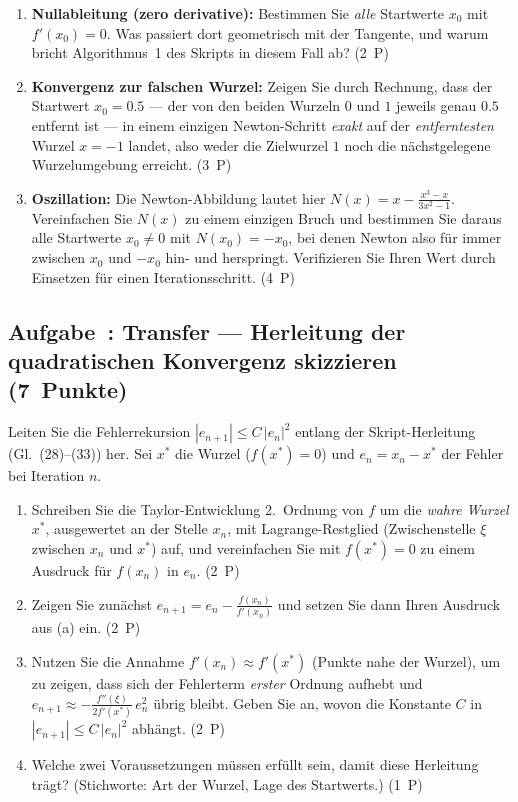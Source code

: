 \documentclass[a4paper,11pt]{scrartcl}
\newcounter{aufgabe}
\newcommand{\Aufgabe}[2]{%
  \refstepcounter{aufgabe}%
  \subsection*{Aufgabe~\theaufgabe: #1 \hfill (#2~Punkte)}%
  \label{auf:\theaufgabe}}
\begin{document}
\begin{enumerate}[label=(\alph*)]
  \item \textbf{Nullableitung (zero derivative):} Bestimmen Sie \emph{alle} Startwerte
  $x_0$ mit $f'(x_0) = 0$. Was passiert dort geometrisch mit der Tangente, und warum
  bricht Algorithmus~1 des Skripts in diesem Fall ab? \hfill (2~P)
  \item \textbf{Konvergenz zur falschen Wurzel:} Zeigen Sie durch Rechnung, dass der
  Startwert $x_0 = 0.5$ --- der von den beiden Wurzeln $0$ und $1$ jeweils genau $0.5$
  entfernt ist --- in einem einzigen Newton-Schritt \emph{exakt} auf der \emph{entferntesten}
  Wurzel $x = -1$ landet, also weder die Zielwurzel $1$ noch die nächstgelegene
  Wurzelumgebung erreicht. \hfill (3~P)
  \item \textbf{Oszillation:} Die Newton-Abbildung lautet hier
  $N(x) = x - \frac{x^3 - x}{3x^2 - 1}$. Vereinfachen Sie $N(x)$ zu einem einzigen
  Bruch und bestimmen Sie daraus alle Startwerte $x_0 \neq 0$ mit $N(x_0) = -x_0$,
  bei denen Newton also für immer zwischen $x_0$ und $-x_0$ hin- und herspringt.
  Verifizieren Sie Ihren Wert durch Einsetzen für einen Iterationsschritt. \hfill (4~P)
\end{enumerate}

\schreibraum[12]
\Aufgabe{Transfer --- Herleitung der quadratischen Konvergenz skizzieren}{7}

Leiten Sie die Fehlerrekursion $|e_{n+1}| \leq C\,|e_n|^2$ entlang der Skript-Herleitung
(Gl.~(28)--(33)) her. Sei $x^*$ die Wurzel ($f(x^*) = 0$) und $e_n = x_n - x^*$ der
Fehler bei Iteration $n$.

\begin{enumerate}[label=(\alph*)]
  \item Schreiben Sie die Taylor-Entwicklung 2.~Ordnung von $f$ um die \emph{wahre
  Wurzel} $x^*$, ausgewertet an der Stelle $x_n$, mit Lagrange-Restglied
  (Zwischenstelle $\xi$ zwischen $x_n$ und $x^*$) auf, und vereinfachen Sie mit
  $f(x^*) = 0$ zu einem Ausdruck für $f(x_n)$ in $e_n$. \hfill (2~P)
  \item Zeigen Sie zunächst $e_{n+1} = e_n - \frac{f(x_n)}{f'(x_n)}$ und setzen Sie
  dann Ihren Ausdruck aus (a) ein. \hfill (2~P)
  \item Nutzen Sie die Annahme $f'(x_n) \approx f'(x^*)$ (Punkte nahe der Wurzel),
  um zu zeigen, dass sich der Fehlerterm \emph{erster} Ordnung aufhebt und
  $e_{n+1} \approx -\frac{f''(\xi)}{2 f'(x^*)}\, e_n^2$ übrig bleibt. Geben Sie an,
  wovon die Konstante $C$ in $|e_{n+1}| \leq C\,|e_n|^2$ abhängt. \hfill (2~P)
  \item Welche zwei Voraussetzungen müssen erfüllt sein, damit diese Herleitung
  trägt? (Stichworte: Art der Wurzel, Lage des Startwerts.) \hfill (1~P)
\end{enumerate}
\end{document}
